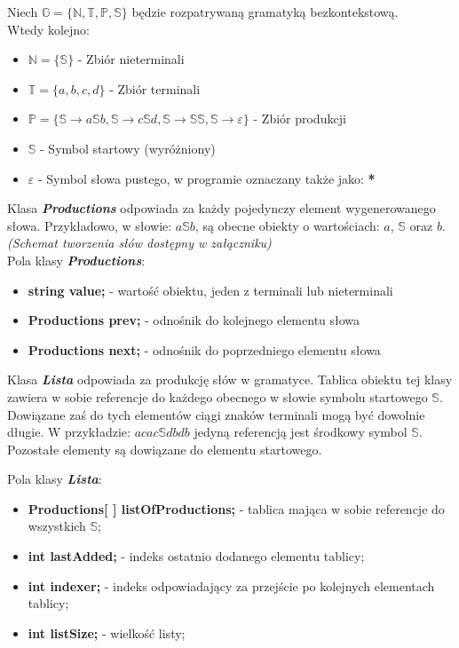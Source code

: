 \documentclass[12pt]{article}
\begin{document}
	 Niech \(\mathbb{G} = \{ \mathbb{N}, \mathbb{T}, \mathbb{P}, \mathbb{S}\}\) będzie rozpatrywaną gramatyką bezkontekstową.\\
	 Wtedy kolejno: \\
	 \begin{itemize}
	 \item \(\mathbb{N} = \{ \mathbb{S} \}\) - Zbiór nieterminali
	 \item \(\mathbb{T} = \{ a, b, c, d \} \) - Zbiór terminali
	 \item \(\mathbb{P} = \{ 
	 	\mathbb{S} \longrightarrow a\mathbb{S}b, \mathbb{S} \longrightarrow c\mathbb{S}d, 
	 	\mathbb{S} \longrightarrow \mathbb{S}\mathbb{S}, \mathbb{S} \longrightarrow \varepsilon
	 	\}\) - Zbiór produkcji
	 \item \(\mathbb{S}\) - Symbol startowy (wyróżniony)
	 \item \(\varepsilon\) - Symbol słowa pustego, w programie oznaczany także jako: \textbf{*}
	 \end{itemize}
	 
	 Klasa \textbf{\textit{Productions}} odpowiada za każdy pojedynczy element wygenerowanego słowa. Przykładowo, w słowie:
	 \(a\mathbb{S}b\), są obecne obiekty o wartościach: \(a\), \(\mathbb{S}\) oraz \(b\).\\
	 \textit{(Schemat tworzenia słów dostępny w załączniku)}\\
	 
	 
	 Pola klasy \textbf{\textit{Productions}}: 
	 \begin{itemize}
	 \item \textbf{string value;} - wartość obiektu, jeden z terminali lub nieterminali
     \item \textbf{Productions prev;} - odnośnik do kolejnego elementu słowa
     \item \textbf{Productions next;} - odnośnik do poprzedniego elementu słowa
	 \end{itemize}
	 
	 
	 Klasa \textbf{\textit{Lista}} odpowiada za produkcję słów w gramatyce. Tablica obiektu tej klasy zawiera w sobie referencje do każdego obecnego w słowie symbolu startowego \(\mathbb{S}\). Dowiązane zaś do tych elementów ciągi znaków terminali mogą być dowolnie długie. W przykładzie: \(acac\mathbb{S}dbdb\) jedyną referencją jest środkowy symbol \(\mathbb{S}\). Pozostałe elementy są dowiązane do elementu startowego.\\ 
	 \newpage
	 
	 Pola klasy \textbf{\textit{Lista}}: 
	 \begin{itemize}
	 \item \textbf{Productions[ ] listOfProductions;} - tablica mająca w sobie referencje do wszystkich         \(\mathbb{S}\);
     \item \textbf{int lastAdded;} - indeks ostatnio dodanego elementu tablicy;
     \item \textbf{int indexer;} - indeks odpowiadający za przejście po kolejnych elementach tablicy;
     \item \textbf{int listSize;} - wielkość listy;
	 \end{itemize}
	 
\end{document}
